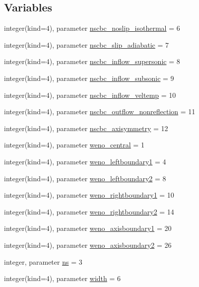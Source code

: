 \subsection*{Variables}
\begin{DoxyCompactItemize}
\item 
integer(kind=4), parameter \hyperlink{namespacenavierstokesrhsweno_acc03638c1b5de1b5efb5bf82d44bab60}{nscbc\+\_\+noslip\+\_\+isothermal} = 6
\item 
integer(kind=4), parameter \hyperlink{namespacenavierstokesrhsweno_a61b688d5e56fecdb26047d0427b4180d}{nscbc\+\_\+slip\+\_\+adiabatic} = 7
\item 
integer(kind=4), parameter \hyperlink{namespacenavierstokesrhsweno_a38d8dd65816be04f23b62b1a44902ad2}{nscbc\+\_\+inflow\+\_\+supersonic} = 8
\item 
integer(kind=4), parameter \hyperlink{namespacenavierstokesrhsweno_a107aa9ceb3e9d2a5a94105422ed2ba17}{nscbc\+\_\+inflow\+\_\+subsonic} = 9
\item 
integer(kind=4), parameter \hyperlink{namespacenavierstokesrhsweno_a5be437968972476e91d15252df952b44}{nscbc\+\_\+inflow\+\_\+veltemp} = 10
\item 
integer(kind=4), parameter \hyperlink{namespacenavierstokesrhsweno_a44d1aa8c46aa6d879e759954abdbb1f6}{nscbc\+\_\+outflow\+\_\+nonreflection} = 11
\item 
integer(kind=4), parameter \hyperlink{namespacenavierstokesrhsweno_a5d52dfb26d090fc1dd8555dbd4b41ea1}{nscbc\+\_\+axisymmetry} = 12
\item 
integer(kind=4), parameter \hyperlink{namespacenavierstokesrhsweno_af011f25d6b892365a71782a1acc53cac}{weno\+\_\+central} = 1
\item 
integer(kind=4), parameter \hyperlink{namespacenavierstokesrhsweno_aaea0ea1a649fc6e1c76d7e09afd83e17}{weno\+\_\+leftboundary1} = 4
\item 
integer(kind=4), parameter \hyperlink{namespacenavierstokesrhsweno_abc7c2a47f826df42ffb4de7f3c3b9e0b}{weno\+\_\+leftboundary2} = 8
\item 
integer(kind=4), parameter \hyperlink{namespacenavierstokesrhsweno_a5f3396ae1256ba3e5cbf718cbf261618}{weno\+\_\+rightboundary1} = 10
\item 
integer(kind=4), parameter \hyperlink{namespacenavierstokesrhsweno_aedc66bac095d9c04f800491a6a77de56}{weno\+\_\+rightboundary2} = 14
\item 
integer(kind=4), parameter \hyperlink{namespacenavierstokesrhsweno_af94f674d95f5f5ef6262da407a7fd4c8}{weno\+\_\+axisboundary1} = 20
\item 
integer(kind=4), parameter \hyperlink{namespacenavierstokesrhsweno_a903f5f21fcefb6a5062f328e7a8b8164}{weno\+\_\+axisboundary2} = 26
\item 
integer, parameter \hyperlink{namespacenavierstokesrhsweno_a24a7b443382b45612203c265466399d4}{ns} = 3
\item 
integer(kind=4), parameter \hyperlink{namespacenavierstokesrhsweno_af00ac01da0553acc8e7382cfc4a5ca1b}{width} = 6
\end{DoxyCompactItemize}


